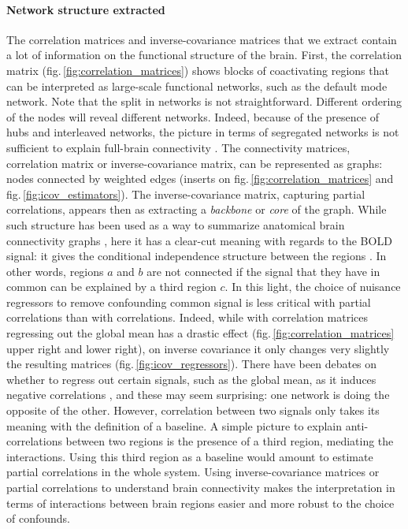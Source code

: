 \documentclass[5p]{elsarticle}
\begin{document}
\paragraph{Network structure extracted}
%
The correlation matrices and inverse-covariance matrices that we extract
contain a lot of information on the functional structure of the brain.
First, the correlation matrix (fig.\,\ref{fig:correlation_matrices})
shows blocks of coactivating regions that can be interpreted as
large-scale functional networks, such as the default mode network. Note
that the split in networks is not straightforward. Different ordering of the
nodes will reveal different networks. Indeed, because of the presence of
hubs and interleaved networks, the picture in terms of segregated networks
is not sufficient to explain full-brain connectivity
\cite{varoquaux2012}. The connectivity matrices, correlation matrix or
inverse-covariance matrix, can be represented as graphs: nodes connected
by weighted edges (inserts on fig.\,\ref{fig:correlation_matrices} and
fig.\,\ref{fig:icov_estimators}). The inverse-covariance matrix,
capturing partial correlations, appears then as extracting a
\emph{backbone} or \emph{core} of the graph. While such structure has
been used as a way to summarize anatomical brain connectivity graphs
\cite{hagmann2008}, here it has a clear-cut meaning with regards to
the BOLD signal: it gives the conditional independence structure between
the regions \cite{varoquaux2012}. In other words, regions $a$ and $b$ are
not connected if the signal that they have in common can be explained by
a third region $c$. In this light, the choice of nuisance regressors to
remove confounding common signal is less critical with partial
correlations than with correlations. Indeed, while with
correlation matrices regressing out the global mean has a drastic effect
(fig.\,\ref{fig:correlation_matrices} upper right and lower right), on
inverse covariance it only changes very slightly the resulting matrices
(fig.\,\ref{fig:icov_regressors}). There have been debates on whether to
regress out certain signals, such as the global mean,  as it induces
negative correlations \cite{murphy2009,chang2009,fox2009}, and these may seem
surprising: one network is doing the opposite of the other. However,
correlation between two signals only takes its meaning with the
definition of a baseline. A simple picture to explain anti-correlations
between two regions is the presence of a third region, mediating the
interactions. Using this third region as a baseline would amount to
estimate partial correlations in the whole system. Using 
inverse-covariance matrices or partial correlations to understand brain
connectivity makes the interpretation in terms of interactions between
brain regions easier and more robust to the choice of confounds.
\end{document}
